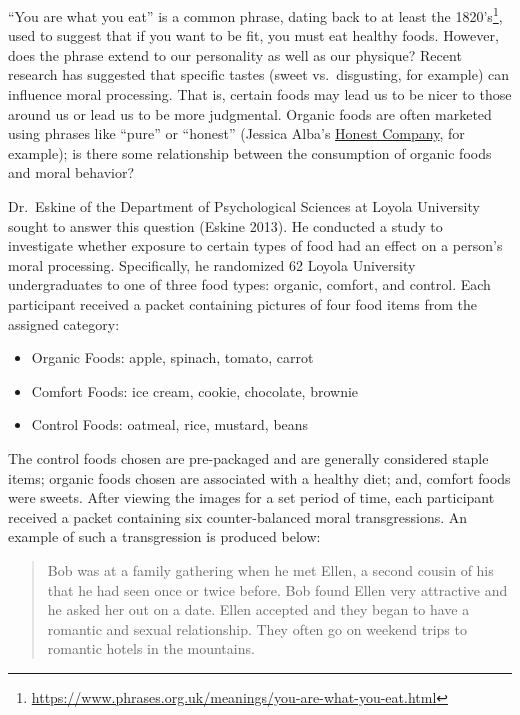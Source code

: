\documentclass[
  letterpaper,
  DIV=11,
  numbers=noendperiod]{scrreprt}
\providecommand{\tightlist}{%
  \setlength{\itemsep}{0pt}\setlength{\parskip}{0pt}}\usepackage{longtable,booktabs,array}
\theoremstyle{plain}
\theoremstyle{definition}
\theoremstyle{definition}
\theoremstyle{remark}
\begin{document}
``You are what you eat'' is a common phrase, dating back to at least the
1820's\footnote{\url{https://www.phrases.org.uk/meanings/you-are-what-you-eat.html}},
used to suggest that if you want to be fit, you must eat healthy foods.
However, does the phrase extend to our personality as well as our
physique? Recent research has suggested that specific tastes (sweet
vs.~disgusting, for example) can influence moral processing. That is,
certain foods may lead us to be nicer to those around us or lead us to
be more judgmental. Organic foods are often marketed using phrases like
``pure'' or ``honest'' (Jessica Alba's
\href{https://www.honest.com/}{Honest Company}, for example); is there
some relationship between the consumption of organic foods and moral
behavior?

Dr.~Eskine of the Department of Psychological Sciences at Loyola
University sought to answer this question (Eskine 2013). He conducted a
study to investigate whether exposure to certain types of food had an
effect on a person's moral processing. Specifically, he randomized 62
Loyola University undergraduates to one of three food types: organic,
comfort, and control. Each participant received a packet containing
pictures of four food items from the assigned category:

\begin{itemize}
\tightlist
\item
  Organic Foods: apple, spinach, tomato, carrot
\item
  Comfort Foods: ice cream, cookie, chocolate, brownie
\item
  Control Foods: oatmeal, rice, mustard, beans
\end{itemize}

The control foods chosen are pre-packaged and are generally considered
staple items; organic foods chosen are associated with a healthy diet;
and, comfort foods were sweets. After viewing the images for a set
period of time, each participant received a packet containing six
counter-balanced moral transgressions. An example of such a
transgression is produced below:

\begin{quote}
Bob was at a family gathering when he met Ellen, a second cousin of his
that he had seen once or twice before. Bob found Ellen very attractive
and he asked her out on a date. Ellen accepted and they began to have a
romantic and sexual relationship. They often go on weekend trips to
romantic hotels in the mountains.
\end{quote}
\end{document}

